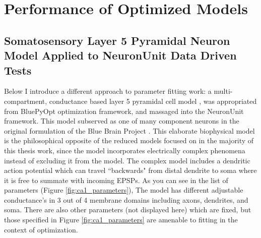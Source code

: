 



%


\section{Performance of Optimized Models}


\subsection{Somatosensory Layer 5 Pyramidal Neuron Model Applied to NeuronUnit Data Driven Tests}

Below I introduce a different approach to parameter fitting work: a multi-compartment, conductance based layer 5 pyramidal cell model \citep{van2016bluepyopt}, was appropriated from BluePyOpt optimization framework, and massaged into the NeuronUnit framework.
This model subserved as one of many component neurons in the original formulation of the Blue Brain Project \cite{markram2015reconstruction}.
This elaborate biophysical model is the philosophical opposite of the reduced models focused on in the majority of this thesis work, since the model incorporates electrically complex phenomena instead of excluding it from the model.
The complex model includes a dendritic action potential which can travel ``backwards" from distal dendrite to soma where it is free to summate with incoming EPSPs.
As you can see in the list of parameters (Figure \ref{fig:ca1_parameters}), The model has different adjustable conductance's in 3 out of 4 membrane domains including axons, dendrites, and soma.
There are also other parameters (not displayed here) which are fixed, but those specified in Figure  \ref{fig:ca1_parameters} are amenable to fitting in the context of optimization.


